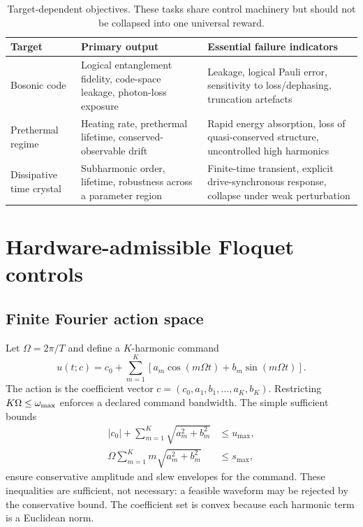 \documentclass[10pt,twoside]{article}
\begin{document}
\begin{table}[t]
\centering\small
\caption{Target-dependent objectives. These tasks share control machinery but should not be collapsed into one universal reward.}
\label{tab:targets}
\begin{tabularx}{\textwidth}{p{}XX}
\toprule
Target & Primary output & Essential failure indicators \\
\midrule
Bosonic code & Logical entanglement fidelity, code-space leakage, photon-loss exposure & Leakage, logical Pauli error, sensitivity to loss/dephasing, truncation artefacts \\
Prethermal regime & Heating rate, prethermal lifetime, conserved-observable drift & Rapid energy absorption, loss of quasi-conserved structure, uncontrolled high harmonics \\
Dissipative time crystal & Subharmonic order, lifetime, robustness across a parameter region & Finite-time transient, explicit drive-synchronous response, collapse under weak perturbation \\
\bottomrule
\end{tabularx}
\end{table}

\section{Hardware-admissible Floquet controls}

\subsection{Finite Fourier action space}

Let $\Omega=2\pi/T$ and define a $K$-harmonic command
\begin{equation}
u(t;c)=c_0+\sum_{m=1}^{K}\left[a_m\cos(m\Omega t)+b_m\sin(m\Omega t)\right].
\label{eq:fourier}
\end{equation}
The action is the coefficient vector $c=(c_0,a_1,b_1,\ldots,a_K,b_K)$. Restricting $K\Omega\leq\omega_{\rm max}$ enforces a declared command bandwidth. The simple sufficient bounds
\begin{align}
|c_0|+\sum_{m=1}^{K}\sqrt{a_m^2+b_m^2}&\leq u_{\max},\label{eq:ampbound}\\
\Omega\sum_{m=1}^{K}m\sqrt{a_m^2+b_m^2}&\leq s_{\max},\label{eq:slewbound}
\end{align}
ensure conservative amplitude and slew envelopes for the command. These inequalities are sufficient, not necessary: a feasible waveform may be rejected by the conservative bound. The coefficient set is convex because each harmonic term is a Euclidean norm.
\end{document}
